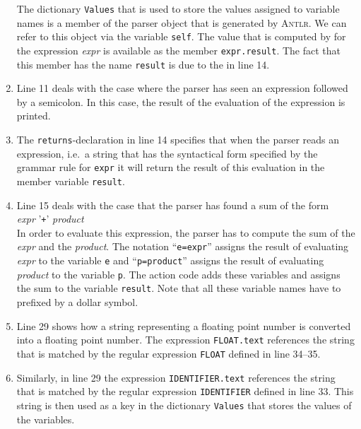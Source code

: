 \begin{enumerate}
      The dictionary \texttt{Values} that is used to store the values assigned to variable names 
      is a member of the parser object that is generated
      by \textsc{Antlr}.  We can refer to this object via the variable \texttt{self}.
      The value that is computed by for the expression \textsl{expr} is available as
      the member \texttt{expr.result}.  
      The fact that this member has the name \texttt{result} is due to the 
      in line 14.
\item Line 11 deals with the case where the parser has seen an expression followed by a semicolon.
      In this case, the result of the evaluation of the expression is printed.
\item The \texttt{returns}-declaration in line 14 specifies that when the parser reads an expression,
      i.e.~a string that has the syntactical form specified by the grammar rule for \texttt{expr}
      it will return the result of this evaluation in the member variable \texttt{result}.
\item Line 15 deals with the case that the parser has found a sum of the form
      \\[0.2cm]
      \hspace*{1.3cm}
      \textsl{expr} '\texttt{+}' \textsl{product}
      \\[0.2cm]
      In order to evaluate this expression, the parser has to compute the sum of the \textsl{expr} and the
      \textsl{product}.  The notation ``\texttt{e=expr}'' assigns the result of evaluating \textsl{expr} to the
      variable \texttt{e} and 
      ``\texttt{p=product}'' assigns the result of evaluating \textsl{product} to the variable \texttt{p}.
      The action code adds these variables and assigns the sum to the variable \texttt{result}. 
      Note that all these variable names have to prefixed by a dollar symbol.
\item Line 29 shows how a string representing a floating point number is converted into a floating point
      number.  The expression \texttt{FLOAT.text} references the string that is matched
      by the regular expression \texttt{FLOAT} defined in line 34--35.
\item Similarly, in line 29 the expression \texttt{IDENTIFIER.text} references the string that is matched
      by the regular expression \texttt{IDENTIFIER} defined in line 33.  This string is then used as a key
      in the dictionary \texttt{Values} that stores the values of the variables.
\end{enumerate}

